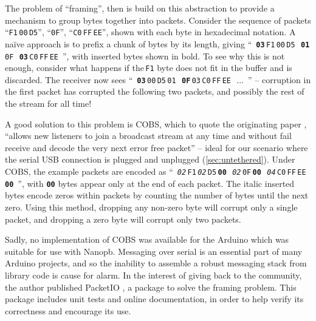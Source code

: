 \documentclass[main.tex]{subfiles}
\begin{document}
		The problem of \enquote{framing}, then is build on this abstraction to provide a mechanism to group bytes together into packets. Consider the sequence of packets
		\enquote{\texttt{F1}\,\texttt{00}\,\texttt{D5}},
		\enquote{\texttt{0F}},
		\enquote{\texttt{C0}\,\texttt{FF}\,\texttt{EE}}, shown with each byte in hexadecimal notation.
		A na\"ive approach is to prefix a chunk of bytes by its length, giving
		\mbox{\enquote{%
			\textbf{\texttt{03}}\,\texttt{F1}\,\texttt{00}\,\texttt{D5}\,%
			\textbf{\texttt{01}}\,\texttt{0F}\,%
			\textbf{\texttt{03}}\,\texttt{C0}\,\texttt{FF}\,\texttt{EE}%
		}}, with inserted bytes shown in bold.
		To see why this is not enough, consider what happens if the\,\texttt{F1} byte does not fit in the buffer and is discarded. The receiver now sees \mbox{\enquote{%
			\textbf{\texttt{03}}\,\texttt{00}\,\texttt{D5}\,\texttt{01}\,%
			\textbf{\texttt{0F}}\,\texttt{03}\,\texttt{C0}\,\texttt{FF}\,\texttt{EE}\,%
			...%
		}} -- corruption in the first packet has corrupted the following two packets, and possibly the rest of the stream for all time!

		A good solution to this problem is COBS, which to quote the originating paper \cite{cobs}, \enquote{allows new listeners to join a broadcast stream at any time and without fail receive and decode the very next error free packet} -- ideal for our scenario where the serial USB connection is plugged and unplugged (\cref{sec:untethered}). Under COBS, the example packets are encoded as
		\mbox{\enquote{%
			\textit{\texttt{02}}\,\texttt{F1}\,\textit{\texttt{02}}\,\texttt{D5}\,\textbf{\texttt{00}}\,%
			\textit{\texttt{02}}\,\texttt{0F}\,\textbf{\texttt{00}}\,%
			\textit{\texttt{04}}\,\texttt{C0}\,\texttt{FF}\,\texttt{EE}\,\textbf{\texttt{00}}%
		}}, with \textbf{\texttt{00}} bytes appear only at the end of each packet.
		The italic inserted bytes encode zeros within packets by counting the number of bytes until the next zero.
		Using this method, dropping any non-zero byte will corrupt only a single packet, and dropping a zero byte will corrupt only two packets.

		Sadly, no implementation of COBS was available for the Arduino which was suitable for use with Nanopb\footnotemark.
		Messaging over serial is an essential part of many Arduino projects, and so the inability to assemble a robust messaging stack from library code is cause for alarm.
		In the interest of giving back to the community, the author published PacketIO \cite{packetio}, a package to solve the framing problem.
		This package includes unit tests and online documentation, in order to help verify its correctness and encourage its use.
\end{document}
